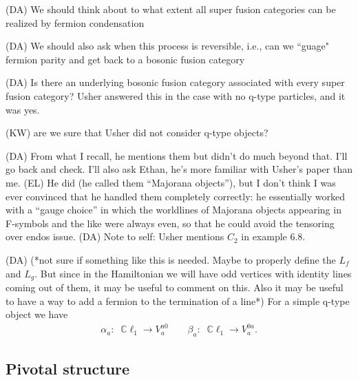\documentclass[12pt,a4paper]{article}
\newcounter{arrow}
\newcommand{\dave}[1]{{\color{ao(english)}\footnotesize{(DA) #1}}}
\newcommand{\ethan}[1]{{\color{amethyst}\footnotesize{(EL) #1}}}
\newcommand{\kw}[1]{{\color{kwcolor}\footnotesize{(KW) #1}}}
\begin{document}
\dave{We should think about to what extent all super fusion categories can be realized by fermion condensation}

\dave{We should also ask when this process is reversible, i.e., can we ``guage" fermion parity and get back to a bosonic fusion category}

\dave{Is there an underlying bosonic fusion category associated with every super fusion category? Usher answered this in the case with no q-type particles, and it was yes.} 

\kw{are we sure that Usher did not consider q-type objects?}

\dave{From what I recall, he mentions them but didn't do much beyond that. I'll go back and check. I'll also ask Ethan, he's more familiar with Usher's paper than me.} \ethan{He did (he called them ``Majorana objects''), but I don't think I was ever convinced that he handled them completely correctly: he essentially worked with a ``gauge choice'' in which the worldlines of Majorana objects appearing in F-symbols and the like were always even, so that he could avoid the tensoring over endos issue.} \dave{Note to self: Usher mentions $C_2$ in example 6.8.}

\dave{(*not sure if something like this is needed. Maybe to properly define the $L_f$ and $L_g$. But since in the Hamiltonian we will have odd vertices with identity lines coming out of them, it may be useful to comment on this. Also it may be useful to have a way to add a fermion to the termination of a line*)
For a simple q-type object we have
\begin{align}
\alpha_a: \; \; \mathbb{C} \ell_1 \rightarrow V^{a 0 }_a \quad \quad \beta_a: \; \; \mathbb{C} \ell_1 \rightarrow V^{0a }_a.
\end{align}
}

\subsection{Pivotal structure}
\end{document}
